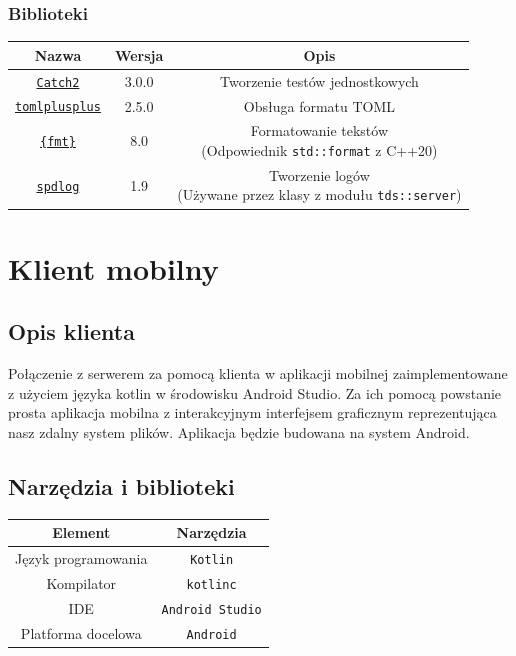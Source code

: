 \documentclass[8pt,a4paper]{article}
\begin{document}
\subsubsection{Biblioteki}
\bgroup
    \begin{center}
        \def\arraystretch{1.3}
        \begin{tabular}{c|c|c}
            \textbf{Nazwa} & \textbf{Wersja} & \textbf{Opis} \\
            \hline
            \texttt{\href{https://github.com/catchorg/Catch2}{Catch2}} & 3.0.0 & Tworzenie testów jednostkowych \\
            \hline
            \texttt{\href{https://github.com/marzer/tomlplusplus}{tomlplusplus}} & 2.5.0 & Obsługa formatu TOML \\
            \hline
            \texttt{\href{https://github.com/fmtlib/fmt}{\{fmt\}}} & 8.0 & \makecell{Formatowanie tekstów\\(Odpowiednik \texttt{std::format} z C++20)} \\
            \hline
            \texttt{\href{https://github.com/gabime/spdlog}{spdlog}} & 1.9 & \makecell{Tworzenie logów\\(Używane przez klasy z modułu \texttt{tds::server})} \\
        \end{tabular}
    \end{center}
\egroup

\section{Klient mobilny}

\subsection{Opis klienta}
Połączenie z serwerem za pomocą klienta w aplikacji mobilnej zaimplementowane z użyciem języka kotlin w środowisku Android Studio. Za ich pomocą powstanie prosta aplikacja mobilna z interakcyjnym interfejsem graficznym reprezentująca nasz zdalny system plików. Aplikacja będzie budowana na system Android.

\subsection{Narzędzia i biblioteki}
\bgroup
    \begin{center}
        \def\arraystretch{1.3}
        \begin{tabular}{c|c}
            \textbf{Element} & \textbf{Narzędzia} \\
            \hline
            Język programowania & \texttt{Kotlin} \\
            \hline
            Kompilator & \texttt{kotlinc} \\
            \hline
            IDE & \texttt{Android Studio} \\
            \hline
            Platforma docelowa & \texttt{Android}
        \end{tabular}
    \end{center}
\egroup
\end{document}

